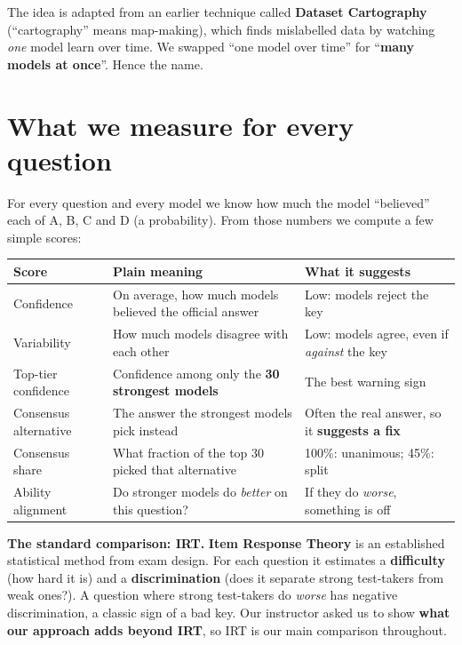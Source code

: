 \documentclass[11pt]{article}
\begin{document}
The idea is adapted from an earlier technique called \textbf{Dataset Cartography}
(``cartography'' means map-making), which finds mislabelled data by watching \emph{one} model learn
over time. We swapped ``one model over time'' for ``\textbf{many models at once}''. Hence the name.

\section{What we measure for every question}

For every question and every model we know how much the model ``believed'' each of A, B, C and D (a
probability). From those numbers we compute a few simple scores:

\begin{center}\small
\begin{tabularx}{\linewidth}{@{}p{3.2cm}YY@{}}
\toprule
\textbf{Score} & \textbf{Plain meaning} & \textbf{What it suggests} \\
\midrule
Confidence & On average, how much models believed the official answer & Low: models reject the key \\
Variability & How much models disagree with each other & Low: models agree, even if \emph{against} the key \\
Top-tier confidence & Confidence among only the \textbf{30 strongest models} & The best warning sign \\
Consensus alternative & The answer the strongest models pick instead & Often the real answer, so it \textbf{suggests a fix} \\
Consensus share & What fraction of the top 30 picked that alternative & 100\%: unanimous; 45\%: split \\
Ability alignment & Do stronger models do \emph{better} on this question? & If they do \emph{worse}, something is off \\
\bottomrule
\end{tabularx}
\end{center}

\textbf{The standard comparison: IRT.} \textbf{Item Response Theory} is an established statistical
method from exam design. For each question it estimates a \textbf{difficulty} (how hard it is) and a
\textbf{discrimination} (does it separate strong test-takers from weak ones?). A question where
strong test-takers do \emph{worse} has negative discrimination, a classic sign of a bad key. Our
instructor asked us to show \textbf{what our approach adds beyond IRT}, so IRT is our main comparison
throughout.
\end{document}
